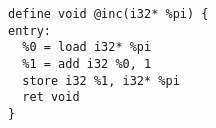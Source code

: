 \documentclass[10pt,a4paper]{article}
\begin{document}
\begin{verbatim}
define void @inc(i32* %pi) {
entry:
  %0 = load i32* %pi
  %1 = add i32 %0, 1
  store i32 %1, i32* %pi
  ret void
}
\end{verbatim}
\end{document}
